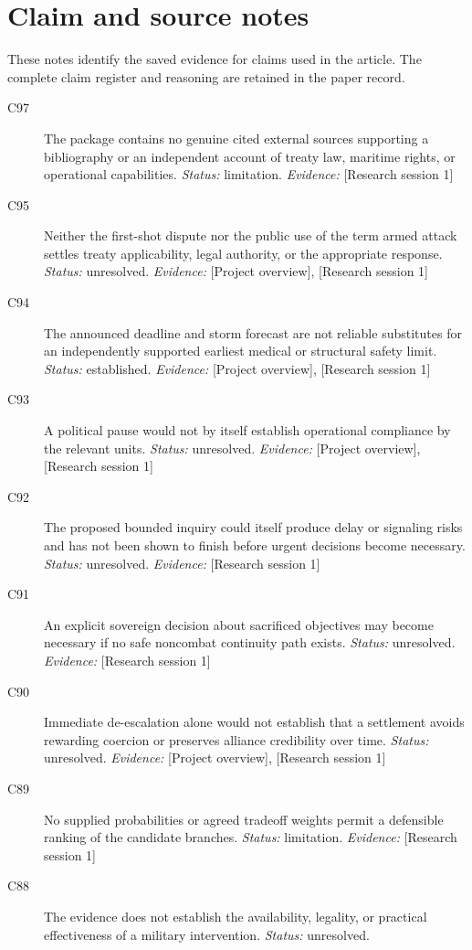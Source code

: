 \documentclass[11pt]{article}
\begin{document}
\section{Claim and source notes}
These notes identify the saved evidence for claims used in the article. The complete claim register and reasoning are retained in the paper record.
\begin{sloppypar}
\small
\begin{description}
\item[C97] The package contains no genuine cited external sources supporting a bibliography or an independent account of treaty law, maritime rights, or operational capabilities. \textit{Status: }limitation.
\textit{Evidence: }[Research session 1]
\item[C95] Neither the first-shot dispute nor the public use of the term armed attack settles treaty applicability, legal authority, or the appropriate response. \textit{Status: }unresolved.
\textit{Evidence: }[Project overview], [Research session 1]
\item[C94] The announced deadline and storm forecast are not reliable substitutes for an independently supported earliest medical or structural safety limit. \textit{Status: }established.
\textit{Evidence: }[Project overview], [Research session 1]
\item[C93] A political pause would not by itself establish operational compliance by the relevant units. \textit{Status: }unresolved.
\textit{Evidence: }[Project overview], [Research session 1]
\item[C92] The proposed bounded inquiry could itself produce delay or signaling risks and has not been shown to finish before urgent decisions become necessary. \textit{Status: }unresolved.
\textit{Evidence: }[Research session 1]
\item[C91] An explicit sovereign decision about sacrificed objectives may become necessary if no safe noncombat continuity path exists. \textit{Status: }unresolved.
\textit{Evidence: }[Research session 1]
\item[C90] Immediate de-escalation alone would not establish that a settlement avoids rewarding coercion or preserves alliance credibility over time. \textit{Status: }unresolved.
\textit{Evidence: }[Project overview], [Research session 1]
\item[C89] No supplied probabilities or agreed tradeoff weights permit a defensible ranking of the candidate branches. \textit{Status: }limitation.
\textit{Evidence: }[Research session 1]
\item[C88] The evidence does not establish the availability, legality, or practical effectiveness of a military intervention. \textit{Status: }unresolved.

\end{description}
\end{sloppypar}
\end{document}
